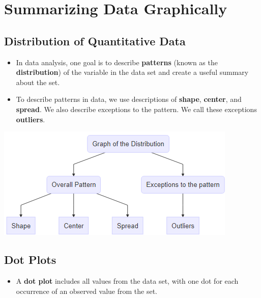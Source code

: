 \section{Summarizing Data Graphically}

\hypertarget{distribution-of-quantitative-data}{%
\subsection{Distribution of Quantitative
Data}\label{distribution-of-quantitative-data}}

\begin{itemize}
\item
  In data analysis, one goal is to describe \textbf{patterns} (known as
  the \textbf{distribution}) of the variable in the data set and create
  a useful summary about the set.
\item
  To describe patterns in data, we use descriptions of \textbf{shape},
  \textbf{center}, and \textbf{spread}. We also describe exceptions to
  the pattern. We call these exceptions \textbf{outliers}.
\end{itemize}

  \begin{center}
    \includegraphics[width=\textwidth]{Figures/Graph-of-Distribution.png}
  \end{center}

\hypertarget{dot-plots}{%
\subsection{Dot Plots}\label{dot-plots}}

\begin{itemize}
\item
  A \textbf{dot plot} includes all values from the data set, with one
  dot for each occurrence of an observed value from the set.
\end{itemize}

